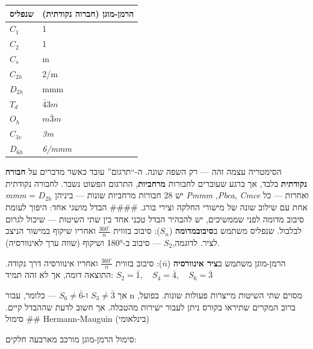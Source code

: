 \documentclass[
  hebrew,
  letterpaper,
  DIV=11,
  numbers=noendperiod]{scrreprt}
\newcounter{none} %
\begin{document}
{\def\LTcaptype{none} %
\begin{longtable}[]{@{}ll@{}}
\toprule\noalign{}
שנפליס & הרמן-מוגן (חברוה נקודתית) \\
\midrule\noalign{}
\endhead
\bottomrule\noalign{}
\endlastfoot
\(C_1\)\hspace{0pt} & 1 \\
\(C_2\) & 1 \\
\(C_s\)\hspace{0pt} & m \\
\(C_{2h}\)\hspace{0pt} & 2/m \\
\(D_{2h}\)\hspace{0pt} & mmm \\
\(T_d​\) & \(\bar{4}3m\) \\
\(O_h\) & \(m\bar{3}m\) \\
\(C_{3v}\) & \emph{3m} \\
\(D_{6h} ​\) & \emph{6/mmm } \\
\end{longtable}
}

הסימטריה עצמה זהה --- רק השפה שונה. ה-``תרגום'' עובד כאשר מדברים על
\textbf{חבורה נקודתית} בלבד, אך ברגע שעוברים לחבורות \textbf{מרחביות},
התרגום הפשוט נשבר. לחבורה נקודתית \emph{mmm} = \(D_{2h}\) \hspace{0pt}יש
28 חבורות מרחביות שונות --- ביניהן \emph{Pmmm} ,\emph{Pbca}, \emph{Cmce}
ואחרות --- כל אחת עם שילוב שונה של מישורי החלקה וצירי בורג. \#\#\#\#
הבדל מושגי אחד: היפוך לעומת סיבוב מדומה לפני שממשיכים, יש להבהיר הבדל
טכני אחד בין שתי השיטות --- שיכול לגרום לבלבול. שנפליס משתמש
ב\textbf{סיבובמדומה} (\(S_n\)\hspace{0pt}): סיבוב בזווית
\(\frac{360^\circ}{n}\) ואחריו שיקוף במישור הניצב לציר.
לדוגמה,\(S_2\)\hspace{0pt} --- סיבוב ב-180° ושיקוף (שווה ערך
לאינוורסיה).

הרמן-מוגן משתמש ב\textbf{ציר אינוורסיה} (\(\bar{n}\)): סיבוב בזווית
\(\frac{360^\circ}{n}\)\hspace{0pt} ואחריו אינוורסיה דרך נקודה. התוצאה
דומה, אך לא זהה תמיד:
\(S_2 = \bar{1}, \quad S_4 = \bar{4}, \quad S_6 = \bar{3}\)

אך \(S_3 \neq \bar{3}\) ו-\(S_6 \neq \bar{6}\) --- כלומר, עבור n מסוים
שתי השיטות מייצרות פעולות שונות. בפועל, ברוב המקרים שתיראו בקורס ניתן
לעבור ישירות מהטבלה. אך חשוב לדעת שההבדל קיים. \#\# סימול
Hermann-Mauguin (בינלאומי)

סימול הרמן-מוגן מורכב מארבעה חלקים:
\end{document}
